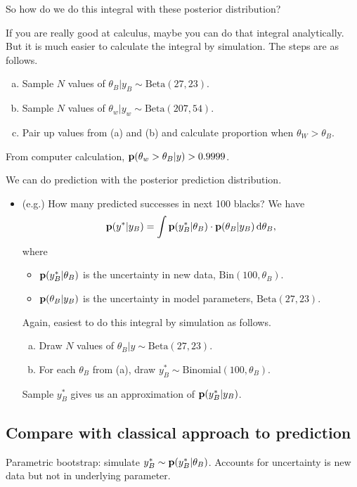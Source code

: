 So how do we do this integral with these posterior distribution?

If you are really good at calculus, maybe you can do that integral analytically. But it is much easier to calculate the integral by simulation. The steps are as follows. 

\begin{enumerate}[(a)]
    \item Sample $N$ values of $\theta_B|y_B \sim \text{Beta}(27, 23)$.
    \item Sample $N$ values of $\theta_w|y_w \sim \text{Beta}(207, 54)$.
    \item Pair up values from (a) and (b) and calculate proportion when $\theta_W > \theta_B$.
\end{enumerate}

From computer calculation, ${\mathbf p}(\theta_w > \theta_B| y) > 0.9999$.

We can do prediction with the posterior prediction distribution.
\begin{itemize}
    \item (e.g.) How many predicted successes in next 100 blacks?
    We have 
    \[
    {\mathbf p}(y^*| y_B) = \int {\mathbf p}(y^*_B | \theta_B) \cdot {\mathbf p}(\theta_B| y_B) \mathop{}\!\mathrm{d} \theta_B,
    \]
    where
    \begin{itemize}
        \item ${\mathbf p}(y^*_B | \theta_B)$ is the uncertainty in new data, $\text{Bin}(100, \theta_B)$.
        \item ${\mathbf p}(\theta_B| y_B)$ is the uncertainty in model parameters, $\text{Beta}(27, 23)$.
    \end{itemize}
    Again, easiest to do this integral by simulation as follows.
    \begin{enumerate}[(a)]
        \item Draw $N$ values of $\theta_B|y \sim \text{Beta}(27, 23)$.
        \item For each $\theta_B$ from (a), draw $y^*_B \sim \text{Binomial}(100, \theta_B)$.
    \end{enumerate}
    Sample $y_B^*$ gives us an approximation of ${\mathbf p}(y_B^*|y_B)$.
\end{itemize}

\subsection{Compare with classical approach to prediction}

Parametric bootstrap: simulate $y^*_B \sim {\mathbf p}(y_B^*| \theta_B)$. Accounts for uncertainty is new data but not in underlying parameter. 

